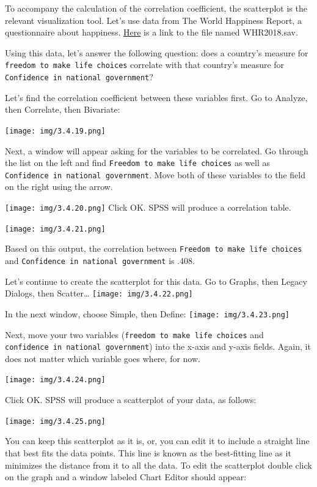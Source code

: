 \documentclass[]{book}
\begin{document}
To accompany the calculation of the correlation coefficient, the
scatterplot is the relevant visualization tool. Let's use data from The
World Happiness Report, a questionnaire about happiness.
\href{https://github.com/CrumpLab/statisticsLab/blob/master/data/spssdata/WHR2018.sav}{Here}
is a link to the file named WHR2018.sav.

Using this data, let's answer the following question: does a country's
measure for \texttt{freedom\ to\ make\ life\ choices} correlate with
that country's measure for
\texttt{Confidence\ in\ national\ government}?

Let's find the correlation coefficient between these variables first. Go
to {Analyze}, then {Correlate}, then {Bivariate}:

\texttt{[image: img/3.4.19.png]}

Next, a window will appear asking for the variables to be correlated. Go
through the list on the left and find
\texttt{Freedom\ to\ make\ life\ choices} as well as
\texttt{Confidence\ in\ national\ government}. Move both of these
variables to the field on the right using the arrow.

\texttt{[image: img/3.4.20.png]} Click OK. SPSS will produce a
correlation table.

\texttt{[image: img/3.4.21.png]}

Based on this output, the correlation between
\texttt{Freedom\ to\ make\ life\ choices} and
\texttt{Confidence\ in\ national\ government} is .408.

Let's continue to create the scatterplot for this data. Go to {Graphs},
then {Legacy Dialogs}, then {Scatter\ldots{}}
\texttt{[image: img/3.4.22.png]}

In the next window, choose {Simple}, then {Define}:
\texttt{[image: img/3.4.23.png]}

Next, move your two variables (\texttt{freedom\ to\ make\ life\ choices}
and \texttt{confidence\ in\ national\ government}) into the x-axis and
y-axis fields. Again, it does not matter which variable goes where, for
now.

\texttt{[image: img/3.4.24.png]}

Click {OK}. SPSS will produce a scatterplot of your data, as follows:

\texttt{[image: img/3.4.25.png]}

You can keep this scatterplot as it is, or, you can edit it to include a
straight line that best fits the data points. This line is known as the
best-fitting line as it minimizes the distance from it to all the data.
To edit the scatterplot double click on the graph and a window labeled
Chart Editor should appear:
\end{document}
